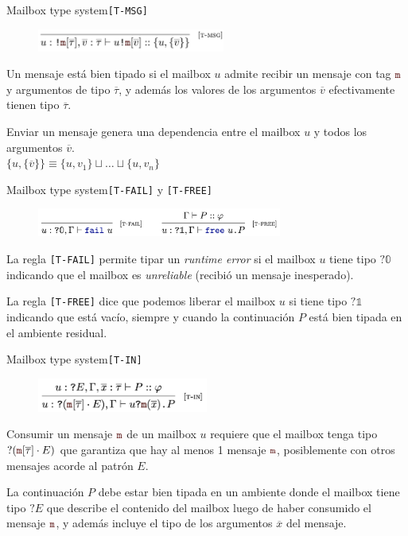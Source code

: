\documentclass{beamer}
\newcommand{\msgtag}[1]{\texttt{\textcolor{msg-color}{#1}}}
\newcommand{\msgstore}[2]{\msgtag{#1}[\overline{#2}]}
\begin{document}
\begin{frame}{Mailbox type system}{\texttt{[T-MSG]}}
    \begin{figure}[H]
        \includegraphics[height=2em]{typing-rules-t-msg}
    \end{figure}

    Un mensaje está bien tipado si el mailbox $u$ admite recibir un mensaje con tag $\msgtag{m}$ y argumentos de tipo $\overline{\tau}$, y además los valores de los argumentos $\overline{v}$ efectivamente tienen tipo $\overline{\tau}$.
    \vspace{1em}

    Enviar un mensaje genera una dependencia entre el mailbox $u$ y todos los argumentos $\overline{v}$.
    \\
    $\{ u, \{ \overline{v} \} \} \equiv \{u, v_1\} \sqcup \dots \sqcup \{u, v_n\}$
\end{frame}

\begin{frame}{Mailbox type system}{\texttt{[T-FAIL]} y \texttt{[T-FREE]}}
    \begin{figure}[H]
        \includegraphics[height=2.5em]{typing-rules-t-fail-t-free}
    \end{figure}

    La regla \texttt{[T-FAIL]} permite tipar un \emph{runtime error} si el mailbox $u$ tiene tipo $?\mathbb{0}$ indicando que el mailbox es \emph{unreliable} (recibió un mensaje inesperado).
    \vspace{1em}

    La regla \texttt{[T-FREE]} dice que podemos liberar el mailbox $u$ si tiene tipo $?\mathbb{1}$ indicando que está vacío, siempre y cuando la continuación $P$ está bien tipada en el ambiente residual.
\end{frame}

\begin{frame}{Mailbox type system}{\texttt{[T-IN]}}
    \begin{figure}[H]
        \includegraphics[height=3em]{typing-rules-t-in}
    \end{figure}

    Consumir un mensaje $\msgtag{m}$ de un mailbox $u$ requiere que el mailbox tenga tipo $?(\msgstore{m}{\tau} \cdot E)$ que garantiza que hay al menos 1 mensaje $\msgtag{m}$, posiblemente con otros mensajes acorde al patrón $E$.
    \vspace{1em}

    La continuación $P$ debe estar bien tipada en un ambiente donde el mailbox tiene tipo $?E$ que describe el contenido del mailbox luego de haber consumido el mensaje $\msgtag{m}$, y además incluye el tipo de los argumentos $\overline{x}$ del mensaje.
\end{frame}
\end{document}
